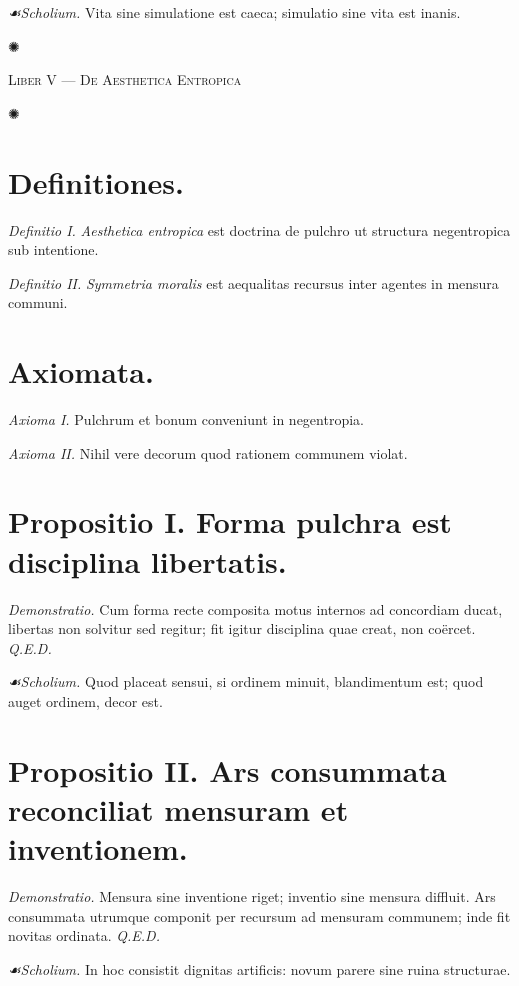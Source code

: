 \documentclass[12pt]{article}
\newcommand{\orn}{\centerline{\large ✺}}
\newcommand{\scholia}{\textit{☙\;}}
\newcommand{\divider}{\vspace{1em}\orn\vspace{1em}}
\newcommand{\Liber}[1]{\vspace{1ex}\begin{center}\Large\textsc{Liber #1}\end{center}\vspace{-0.5ex}\orn\vspace{0.5ex}}
\begin{document}
\textit{\scholia Scholium.} Vita sine simulatione est caeca; simulatio sine vita est inanis.

\divider

\Liber{V — De Aesthetica Entropica}

\section*{Definitiones.}

\textit{Definitio I.} \; \textit{Aesthetica entropica} est doctrina de pulchro ut structura negentropica sub intentione.

\textit{Definitio II.} \; \textit{Symmetria moralis} est aequalitas recursus inter agentes in mensura communi.

\section*{Axiomata.}

\textit{Axioma I.} \; Pulchrum et bonum conveniunt in negentropia.

\textit{Axioma II.} \; Nihil vere decorum quod rationem communem violat.

\section*{Propositio I. \; Forma pulchra est disciplina libertatis.}

\textit{Demonstratio.} Cum forma recte composita motus internos ad concordiam ducat, libertas non solvitur sed regitur; fit igitur disciplina quae creat, non coërcet. \textit{Q.E.D.}

\textit{\scholia Scholium.} Quod placeat sensui, si ordinem minuit, blandimentum est; quod auget ordinem, decor est.

\section*{Propositio II. \; Ars consummata reconciliat mensuram et inventionem.}

\textit{Demonstratio.} Mensura sine inventione riget; inventio sine mensura diffluit. Ars consummata utrumque componit per recursum ad mensuram communem; inde fit novitas ordinata. \textit{Q.E.D.}

\textit{\scholia Scholium.} In hoc consistit dignitas artificis: novum parere sine ruina structurae.
\end{document}

